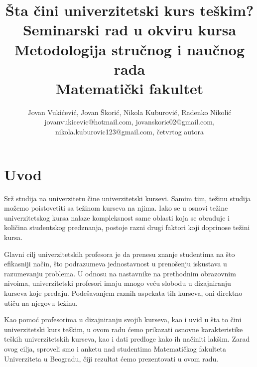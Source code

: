 \documentclass[a4paper]{article}
\begin{document}
\title{Šta čini univerzitetski kurs teškim?\\ \small{Seminarski rad u okviru kursa\\Metodologija stručnog i naučnog rada\\ Matematički fakultet}}

\author{Jovan Vukićević, Jovan Škorić, Nikola Kuburović, Radenko Nikolić\\ jovanvukicevic@hotmail.com, jovanskoric02@gmail.com, nikola.kuburovic123@gmail.com, četvrtog autora}


\maketitle


\tableofcontents

\newpage

\section{Uvod}
\label{sec:uvod}

Srž studija na univerzitetu čine univerzitetski kursevi. Samim tim, težinu studija možemo poistovetiti sa težinom kurseva na njima. Iako se u osnovi težine univerzitetskog kursa nalaze kompleksnost same oblasti koja se obrađuje i količina studentskog predznanja, postoje razni drugi faktori koji doprinose težini kursa.

Glavni cilj univerzitetskih profesora je da prenesu znanje studentima na što efikasniji način, što podrazumeva jednostavnost u prenošenju iskustava u razumevanju problema. U odnosu na nastavnike na prethodnim obrazovnim nivoima, univerzitetski profesori imaju mnogo veću slobodu u dizajniranju kurseva koje predaju. Podešavanjem raznih aspekata tih kurseva, oni direktno utiču na njegovu težinu.

Kao pomoć profesorima u dizajniranju svojih kurseva, kao i uvid u šta to čini univerzitetski kurs teškim, u ovom radu ćemo prikazati osnovne karakteristike teških univerzitetskih kurseva, kao i dati predloge kako ih načiniti lakšim. Zarad ovog cilja, sproveli smo i anketu nad studentima Matematičkog fakulteta Univerziteta u Beogradu, čiji rezultat ćemo prezentovati u ovom radu.
\end{document}

